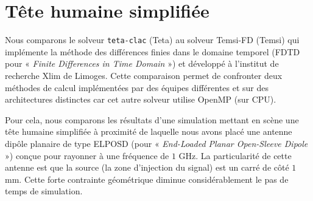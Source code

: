 \begin{figure}[!h]
\begin{center}
{
		}
	\end{center}
\end{figure}



\section{Tête humaine simplifiée}
\label{sect:tete_simplifiee}


Nous comparons le solveur \texttt{teta-clac} (Teta) au solveur Temsi-FD \cite{guiffaut2000contribution} (Temsi) qui implémente
la méthode des différences finies dans le domaine temporel (FDTD pour
« \textit{Finite Differences in Time Domain} ») et développé
à l'institut de recherche Xlim de Limoges.
Cette comparaison permet de confronter deux méthodes de calcul
implémentées par des équipes différentes et sur des architectures
distinctes car cet autre solveur utilise OpenMP (sur CPU).

Pour cela, nous comparons les résultats d'une simulation mettant en scène
une tête humaine simplifiée à proximité de laquelle nous avons placé une
antenne dipôle planaire de type ELPOSD
(pour « \textit{End-Loaded Planar Open-Sleeve Dipole} ») \cite{4020422}
conçue pour rayonner à une fréquence de $1$ GHz.
La particularité de cette antenne est que la source (la zone d'injection du signal) est un carré de côté
$1$ mm.
Cette forte contrainte géométrique diminue considérablement le pas de temps de simulation.
\\

